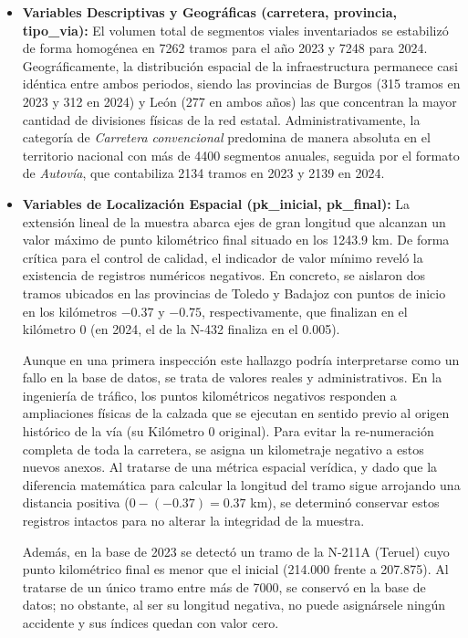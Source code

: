 \documentclass[twoside,a4paper,12pt,onecolumn,openany]{book}
\begin{document}
\begin{itemize}
    \item \textbf{Variables Descriptivas y Geográficas (carretera, provincia, tipo\_via):} El volumen total de segmentos viales inventariados se estabilizó de forma homogénea en 7262 tramos para el año 2023 y 7248 para 2024. Geográficamente, la distribución espacial de la infraestructura permanece casi idéntica entre ambos periodos, siendo las provincias de Burgos (315 tramos en 2023 y 312 en 2024) y León (277 en ambos años) las que concentran la mayor cantidad de divisiones físicas de la red estatal. Administrativamente, la categoría de \textit{Carretera convencional} predomina de manera absoluta en el territorio nacional con más de 4400 segmentos anuales, seguida por el formato de \textit{Autovía}, que contabiliza 2134 tramos en 2023 y 2139 en 2024.
    
    \item \textbf{Variables de Localización Espacial (pk\_inicial, pk\_final):} La extensión lineal de la muestra abarca ejes de gran longitud que alcanzan un valor máximo de punto kilométrico final situado en los 1243.9 km. De forma crítica para el control de calidad, el indicador de valor mínimo reveló la existencia de registros numéricos negativos. En concreto, se aislaron dos tramos ubicados en las provincias de Toledo y Badajoz con puntos de inicio en los kilómetros $-0.37$ y $-0.75$, respectivamente, que finalizan en el kilómetro 0 (en 2024, el de la N-432 finaliza en el 0.005).
    
    Aunque en una primera inspección este hallazgo podría interpretarse como un fallo en la base de datos, se trata de valores reales y administrativos. En la ingeniería de tráfico, los puntos kilométricos negativos responden a ampliaciones físicas de la calzada que se ejecutan en sentido previo al origen histórico de la vía (su Kilómetro 0 original). Para evitar la re-numeración completa de toda la carretera, se asigna un kilometraje negativo a estos nuevos anexos. Al tratarse de una métrica espacial verídica, y dado que la diferencia matemática para calcular la longitud del tramo sigue arrojando una distancia positiva ($0 - (-0.37) = 0.37$ km), se determinó conservar estos registros intactos para no alterar la integridad de la muestra.
        
    Además, en la base de 2023 se detectó un tramo de la N-211A (Teruel) cuyo punto kilométrico final es menor que el inicial (214.000 frente a 207.875). Al tratarse de un único tramo entre más de 7000, se conservó en la base de datos; no obstante, al ser su longitud negativa, no puede asignársele ningún accidente y sus índices quedan con valor cero.
    

\end{itemize}
\end{document}
